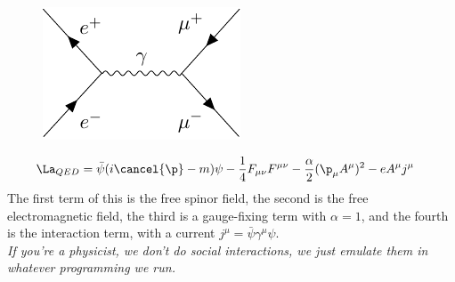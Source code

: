 \documentclass[a4paper, 11pt, normalem]{report}
\begin{document}
\chapter{}
\begin{figure}[H]
    \centering
    \includegraphics{etomu.pdf}
    \vspace{-30pt}
\end{figure}
\begin{align}
    \La_{QED} &= \bar{\psi}(i\cancel{\p}-m)\psi - \frac14F_{\mu\nu}F^{\mu\nu} - \frac{\alpha}{2}(\p_\mu A^\mu)^2 - eA^\mu j^\mu
\end{align}
The first term of this is the free spinor field, the second is the free electromagnetic field, the third is a gauge-fixing term with $\alpha=1$, and the fourth is the interaction term, with a current $j^\mu = \bar{\psi}\gamma^\mu\psi$.\\
\textit{If you're a physicist, we don't do social interactions, we just emulate them in whatever programming we run.}
\end{document}
